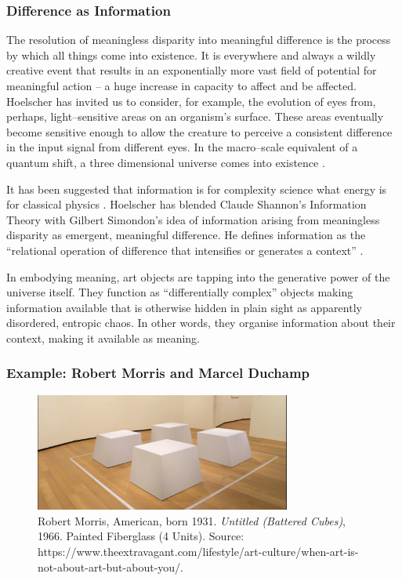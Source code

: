 \documentclass[letterpaper]{article}
\begin{document}
    \subsubsection{Difference as Information}

    The resolution of meaningless disparity into meaningful difference is the process by which all things come into existence. It is everywhere and always a wildly creative event that results in an exponentially more vast field of potential for meaningful action – a huge increase in capacity to affect and be affected. Hoelscher has invited us to consider, for example, the evolution of eyes from, perhaps, light–sensitive areas on an organism's surface. These areas eventually become sensitive enough to allow the creature to perceive a consistent difference in the input signal from different eyes. In the macro–scale equivalent of a quantum shift, a three dimensional universe comes into existence \citep[p.5]{HoelscherArtAsInfrmtn2021}.

    It has been suggested that information is for complexity science what energy is for classical physics \citep[0:52]{CrutchfieldIntrdctnToCmplxty2018} \citep{CrutfieldRtAlSgntrsOfInfnty2015}. Hoelscher has blended Claude Shannon's Information Theory with Gilbert Simondon's idea of information arising from meaningless disparity as emergent, meaningful difference. He defines information as the “relational operation of difference that intensifies or generates a context” \citep[p.6]{HoelscherArtAsInfrmtn2021}.
    
    In embodying meaning, art objects are tapping into the generative power of the universe itself. They function as “differentially complex” \citep[p.74]{HoelscherArtAsInfrmtn2021} objects making information available that is otherwise hidden in plain sight as apparently disordered, entropic chaos. In other words, they organise information about their context, making it available as meaning.

    \subsubsection{Example: Robert Morris and Marcel Duchamp}

    \begin{figure}[h]
    \includegraphics[width=3.31in]{robert-morris-cubes.png}
    \caption{Robert Morris, American, born 1931. \emph{Untitled (Battered Cubes)}, 1966. Painted Fiberglass (4 Units). Source: https://www.theextravagant.com/lifestyle/art-culture/when-art-is-not-about-art-but-about-you/.}
    \end{figure}
\end{document}
